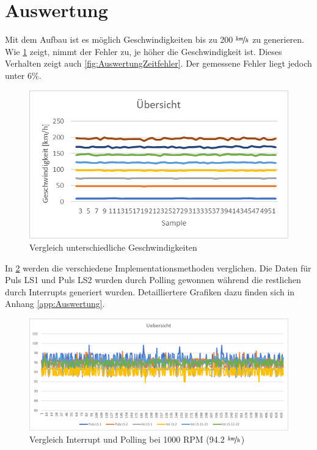 \section{Auswertung}
Mit dem Aufbau ist es möglich Geschwindigkeiten bis zu 200 $\nicefrac{km}{h}$ zu generieren. Wie \ref{fig:AuswertungSpeed} zeigt, nimmt der Fehler zu, je höher die Geschwindigkeit ist. Dieses Verhalten zeigt auch \ref{fig:AuswertungZeitfehler}. Der gemessene  Fehler liegt jedoch unter 6\%.\\
\begin{figure}[ht]
    \centering
    \includegraphics[width=\textwidth]{images/auswertungSpeedUeb.png}
    \caption{Vergleich unterschiedliche Geschwindigkeiten}
    \label{fig:AuswertungSpeed}
\end{figure}

In \ref{fig:AuswertungInt}  werden die verschiedene Implementationsmethoden verglichen.
Die Daten für Puls LS1 und Puls LS2 wurden durch Polling gewonnen während die restlichen durch Interrupts generiert wurden. Detailliertere Grafiken dazu finden sich in Anhang \ref{app:Auswertung}.
\begin{figure}[ht]
    \centering
    	\includegraphics[width=\textwidth]{images/auswertungInt.png}
    \caption{Vergleich Interrupt und Polling bei 1000 RPM (94.2 $\nicefrac{km}{h}$)}
    \label{fig:AuswertungInt}
\end{figure}


